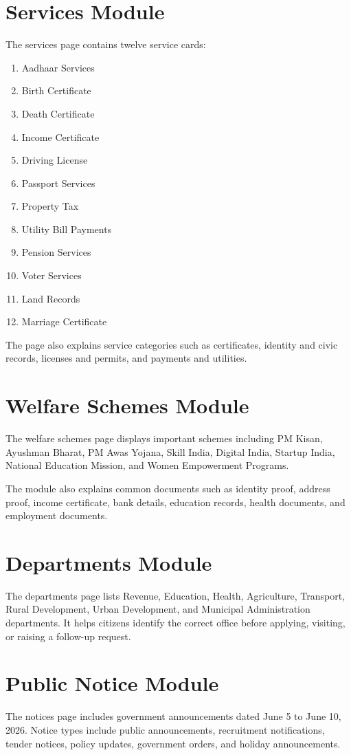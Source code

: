 \documentclass[12pt,a4paper]{report}
\begin{document}
\section{Services Module}
The services page contains twelve service cards:
\begin{enumerate}[leftmargin=0.4in]
    \item Aadhaar Services
    \item Birth Certificate
    \item Death Certificate
    \item Income Certificate
    \item Driving License
    \item Passport Services
    \item Property Tax
    \item Utility Bill Payments
    \item Pension Services
    \item Voter Services
    \item Land Records
    \item Marriage Certificate
\end{enumerate}

The page also explains service categories such as certificates, identity and civic records, licenses and permits, and payments and utilities.

\section{Welfare Schemes Module}
The welfare schemes page displays important schemes including PM Kisan, Ayushman Bharat, PM Awas Yojana, Skill India, Digital India, Startup India, National Education Mission, and Women Empowerment Programs.

The module also explains common documents such as identity proof, address proof, income certificate, bank details, education records, health documents, and employment documents.

\section{Departments Module}
The departments page lists Revenue, Education, Health, Agriculture, Transport, Rural Development, Urban Development, and Municipal Administration departments. It helps citizens identify the correct office before applying, visiting, or raising a follow-up request.

\section{Public Notice Module}
The notices page includes government announcements dated June 5 to June 10, 2026. Notice types include public announcements, recruitment notifications, tender notices, policy updates, government orders, and holiday announcements.
\end{document}
